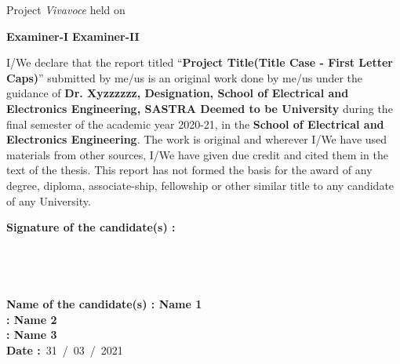 \documentclass[a4paper, 12pt, oneside]{sastra}
\begin{document}
	\vspace*{0.35in}
	
	\noindent Project \textit{Vivavoce} held on
	
	\vspace*{0.50in}
	\noindent \textbf{Examiner-I} \hspace*{120mm} \textbf{Examiner-II}
	
	
	\declaration
	
	
	\begin{doublespace}
		\linespread{2}
		
		I/We declare that the report titled ``\textbf{Project Title(Title Case - First Letter Caps)}'' submitted by me/us is an original work done by me/us under the guidance of \textbf{Dr. Xyzzzzzz, Designation, School of Electrical and Electronics Engineering, SASTRA Deemed to be University} during the final semester of the academic year 2020-21, in the \textbf{School of Electrical and Electronics Engineering}. The work is original and wherever I/We have used materials from other sources, I/We have given due credit and cited them in the text of the thesis. This report has not formed the basis for the award of any degree, diploma, associate-ship, fellowship or other similar title to any candidate of any University.\\
		
	\end{doublespace}
	\noindent \textbf{Signature of the candidate(s)	:}	
	\\
	\\
	\\
	\\
	\\
	\noindent\textbf{Name of the candidate(s)\hspace{7mm}		: Name 1}\\
	\hspace*{53mm}\textbf{: Name 2}\\
	\hspace*{53mm}\textbf{: Name 3}\\
	\noindent\textbf{Date\hspace*{43.5mm}					:}~31~/~03~/~2021\\%
	
	\acknowledgements
	
\end{document}
